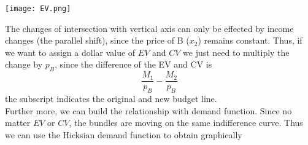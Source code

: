 \documentclass[10pt]{article}
\newenvironment{changemargin}[2]{%
  \begin{list}{}{%
    \setlength{\topsep}{0pt}%
    \setlength{\leftmargin}{#1}%
    \setlength{\rightmargin}{#2}%
    \setlength{\listparindent}{\parindent}%
    \setlength{\itemindent}{\parindent}%
    \setlength{\parsep}{\parskip}%
  }%
  \item[]}{\end{list}}
\begin{document}
\begin{changemargin}{-0.125in}{0in}
\begin{enumerate}
\begin{itemize}
                  \begin{center}
                  	\texttt{[image: EV.png]}
                  \end{center}
                  
                 \end{itemize}
                 
                 The changes of intersection with vertical axis can only be effected by income changes (the parallel shift), since the price of B ($x_2$) remains constant. Thus, if we want to assign a dollar value of $EV$ and $CV$ we just need to multiply the change by $p_B$, since the difference of the EV and CV is 
                 \[
                  \frac{M_1}{p_B} - \frac{M_2}{p_B}
                 \]
                 the subscript indicates the original and new budget line.\\
                 
                 Further more, we can build the relationship with 
                 demand function. Since no matter $EV$ or $CV$, the bundles are moving on the same indifference curve. Thus we can use the Hicksian demand function to obtain graphically 
                 
                 
                 \begin{figure}[H]
                   \centering
                  \end{figure}
                  

\end{enumerate}
\end{changemargin}
\end{document}
